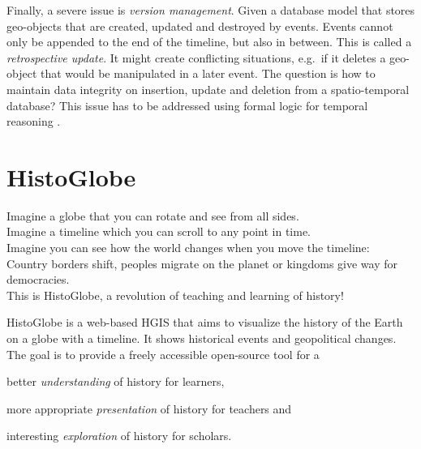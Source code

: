 Finally, a severe issue is \emph{version management}. Given a database model that stores geo-objects that are created, updated and destroyed by events. Events cannot only be appended to the end of the timeline, but also in between. This is called a \emph{retrospective update}. It might create conflicting situations, e.g.\ if it deletes a geo-object that would be manipulated in a later event. The question is how to maintain data integrity on insertion, update and deletion from a spatio-temporal database? This issue has to be addressed using formal logic for temporal reasoning
\cite[section 6]{peuquet99}.




\section{HistoGlobe} %
\label{sec:histoglobe}

\begin{quoteit}
  Imagine a globe that you can rotate and see from all sides. \\
  Imagine a timeline which you can scroll to any point in time. \\
  Imagine you can see how the world changes when you move the timeline: \\
  Country borders shift, peoples migrate on the planet or kingdoms give way for democracies. \\[0.5em]
  This is HistoGlobe, a revolution of teaching and learning of history!
\end{quoteit}

HistoGlobe is a web-based HGIS that aims to visualize the history of the Earth on a globe with a timeline. It shows historical events and geopolitical changes. The goal is to provide a freely accessible open-source tool for a

\begin{compactitem}
  \item better \emph{understanding} of history for learners,
  \item more appropriate \emph{presentation} of history for teachers and
  \item interesting \emph{exploration} of history for scholars.
\end{compactitem}

